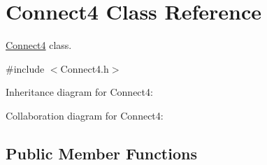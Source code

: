 \hypertarget{class_connect4}{\section{Connect4 Class Reference}
\label{class_connect4}
}


\hyperlink{class_connect4}{Connect4} class.  




{\ttfamily \#include $<$Connect4.\+h$>$}



Inheritance diagram for Connect4\+:


Collaboration diagram for Connect4\+:
\subsection*{Public Member Functions}
